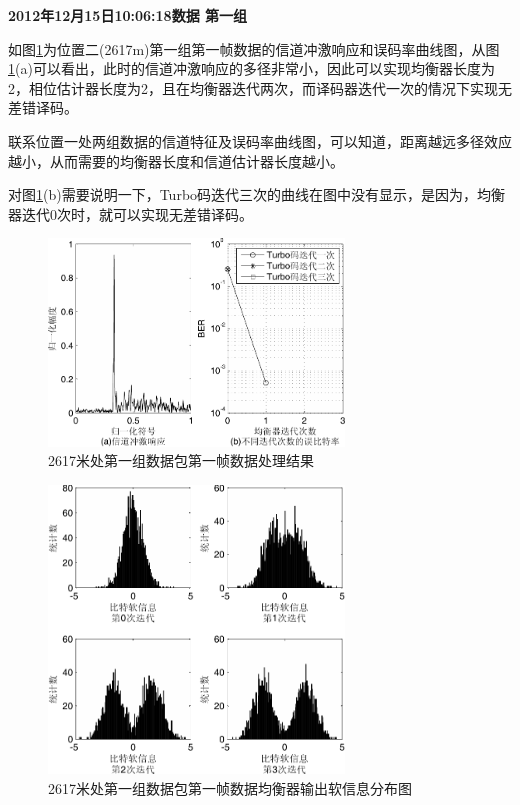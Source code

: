 \textbf{\sihao 2012年12月15日10:06:18数据 第一组} 

如图\ref{fig:6.11}为位置二(2617m)第一组第一帧数据的信道冲激响应和误码率曲线图，从图\ref{fig:6.11}(a)可以看出，此时的信道冲激响应的多径非常小，因此可以实现均衡器长度为2，相位估计器长度为2，且在均衡器迭代两次，而译码器迭代一次的情况下实现无差错译码。

联系位置一处两组数据的信道特征及误码率曲线图，可以知道，距离越远多径效应越小，从而需要的均衡器长度和信道估计器长度越小。

对图\ref{fig:6.11}(b)需要说明一下，Turbo码迭代三次的曲线在图中没有显示，是因为，均衡器迭代0次时，就可以实现无差错译码。

\begin{figure}[htb]
  \begin{center}
    \includegraphics[width=0.7\textwidth]{images/result_2_1_s.pdf}
  \end{center}
  \caption{2617米处第一组数据包第一帧数据处理结果}
  \label{fig:6.11}
\end{figure}

\begin{figure}[htb]
  \begin{center}
    \includegraphics[width=0.7\textwidth]{images/softInfo_2_1.pdf}
  \end{center}
  \caption{2617米处第一组数据包第一帧数据均衡器输出软信息分布图}
  \label{fig:6.11s}
\end{figure}

